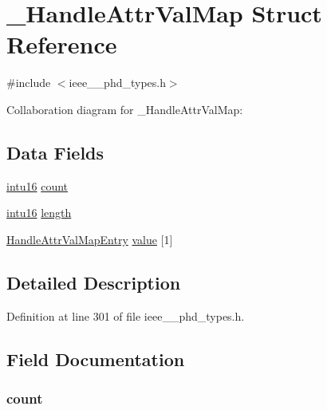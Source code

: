 \hypertarget{struct___handle_attr_val_map}{}\section{\+\_\+\+Handle\+Attr\+Val\+Map Struct Reference}
\label{struct___handle_attr_val_map}


{\ttfamily \#include $<$ieee\+\_\+\_\+phd\+\_\+types.\+h$>$}



Collaboration diagram for \+\_\+\+Handle\+Attr\+Val\+Map\+:
\subsection*{Data Fields}
\begin{DoxyCompactItemize}
\item 
\hyperlink{ieee__11073__phd__types_8h_a3561595d2aa7416532e1c9910abd076d}{intu16} \hyperlink{struct___handle_attr_val_map_abf6db060ae8e224764b0f867fb135ecd}{count}
\item 
\hyperlink{ieee__11073__phd__types_8h_a3561595d2aa7416532e1c9910abd076d}{intu16} \hyperlink{struct___handle_attr_val_map_a3743679e4ff85e3e1b3fc2e59973fbb3}{length}
\item 
\hyperlink{ieee__11073__phd__types_8h_a38b459f98fa780f61063d6433de563a7}{Handle\+Attr\+Val\+Map\+Entry} \hyperlink{struct___handle_attr_val_map_af2e7a3794cf60c619f935b4782828313}{value} \mbox{[}1\mbox{]}
\end{DoxyCompactItemize}


\subsection{Detailed Description}


Definition at line 301 of file ieee\+\_\+\_\+phd\+\_\+types.\+h.



\subsection{Field Documentation}
\hypertarget{struct___handle_attr_val_map_abf6db060ae8e224764b0f867fb135ecd}{}
\subsubsection[{count}]{ count}\label{struct___handle_attr_val_map_abf6db060ae8e224764b0f867fb135ecd}



